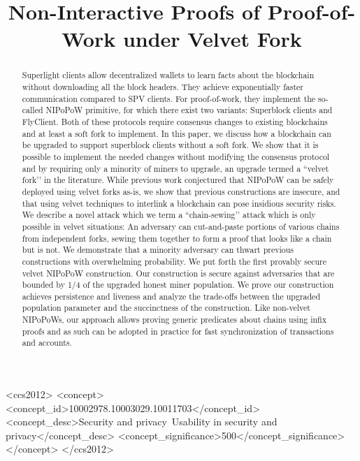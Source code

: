 \documentclass[sigconf, anonymous]{acmart}
\theoremstyle{plain}
\theoremstyle{definition}
\begin{document}
\title{Non-Interactive Proofs of Proof-of-Work under Velvet Fork} %

\begin{abstract}
Superlight clients allow decentralized wallets to learn facts about the blockchain without downloading all the block headers. They achieve exponentially faster communication compared to SPV clients. For proof-of-work, they implement the so-called NIPoPoW primitive, for which there exist two variants: Superblock clients and FlyClient. Both of these protocols require consensus changes to existing blockchains and at least a soft fork to implement. In this paper, we discuss how a blockchain can be upgraded to support superblock clients without a soft fork. We show that it is possible to implement the needed changes without modifying the consensus protocol and by requiring only a minority of miners to upgrade, an upgrade termed a ``velvet fork’' in the literature. While previous work conjectured that NIPoPoW can be safely deployed using velvet forks as-is, we show that previous constructions are insecure, and that using velvet techniques to interlink a blockchain can pose insidious security risks. We describe a novel attack which we term a ``chain-sewing’' attack which is only possible in velvet situations: An adversary can cut-and-paste portions of various chains from independent forks, sewing them together to form a proof that looks like a chain but is not. We demonstrate that a minority adversary can thwart previous constructions with overwhelming probability. We put forth the first provably secure velvet NIPoPoW construction. Our construction is secure against adversaries that are bounded by 1/4 of the upgraded honest miner population. We prove our construction achieves persistence and liveness and analyze the trade-offs between the upgraded population parameter and the succinctness of the construction. Like non-velvet NIPoPoWs, our approach allows proving generic predicates about chains using infix proofs and as such can be adopted in practice for fast synchronization of transactions and accounts.
\end{abstract}

\begin{CCSXML}
<ccs2012>
<concept>
<concept_id>10002978.10003029.10011703</concept_id>
<concept_desc>Security and privacy~Usability in security and privacy</concept_desc>
<concept_significance>500</concept_significance>
</concept>
</ccs2012>
\end{CCSXML}



\maketitle





\end{document}
